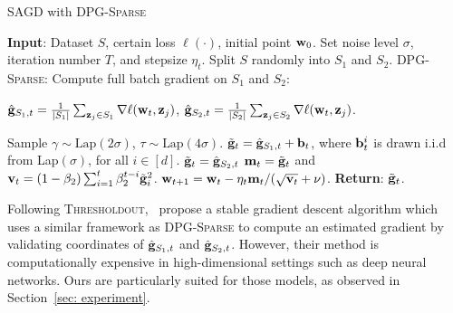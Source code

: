 \documentclass[11pt]{article}
\begin{document}
\begin{algorithm}[H]
\caption{\textsc{SAGD} with \textsc{DPG-Sparse}}
\begin{algorithmic}[1]
\label{algo: sparse}
\STATE \textbf{Input}: Dataset $S$,  certain loss $\ell(\cdot)$, initial point $\mathbf{w}_0$.
\STATE Set  noise level $\sigma$, iteration number $T$,  and stepsize $\eta_t$.
\STATE Split $S$ randomly into $S_1$ and $S_2$. 
\STATE   \textsc{DPG-Sparse:} Compute full batch gradient on $S_1$ and $S_2$:\\
\centerline{$\hat {\mathbf{g}}_{S_1,t} = \frac{1}{|S_1|} \sum_{\mathbf{z}_j \in S_1}\nabla \ell(\mathbf{w}_t, \mathbf{z}_j)$,%
\hspace{0.2in}
$\hat {\mathbf{g}}_{S_2,t} = \frac{1}{|S_2|} \sum_{\mathbf{z}_j \in S_2}\nabla \ell(\mathbf{w}_t, \mathbf{z}_j)$.}
\STATE Sample $\gamma \sim \text{Lap}(2\sigma)$, $\tau \sim \text{Lap}(4\sigma)$.
\STATE  $\tilde {\mathbf{g}}_t = \hat {\mathbf{g}}_{S_1,t} + \mathbf{b}_t$, where $\mathbf{b}_t^i$ is drawn i.i.d from Lap$(\sigma)$, for all $ i \in [d]$.
\ELSE \STATE $\tilde {\mathbf{g}}_t = \hat {\mathbf{g}}_{S_2,t}$
\ENDIF
\STATE 
$\mathbf{m}_t = \tilde {\mathbf{g}}_t$ and $\mathbf{v}_t = \left(1-\beta_{2}\right) \sum_{i=1}^{t} \beta_{2}^{t-i} \tilde {\mathbf{g}}_{i}^{2}$.
\STATE $\mathbf{w}_{t+1}=\mathbf{w}_{t}-\eta_t \mathbf{m}_t /(\sqrt{\mathbf{v}_t}+\nu)$.
\ENDFOR 
\STATE \textbf{Return}: $\tilde {\mathbf{g}}_t$.
\end{algorithmic}
\end{algorithm}\vspace{-0.1in}

Following \textsc{Thresholdout},~\citet{zhch2018} propose a stable gradient descent algorithm which uses a similar framework as \textsc{DPG-Sparse} to compute an estimated gradient by validating coordinates of $\hat {\mathbf{g}}_{S_1,t}$ and $\hat {\mathbf{g}}_{S_2,t}$. 
However, their method is computationally expensive in high-dimensional settings such as deep neural networks. Ours are particularly suited for those models, as observed in Section~\ref{sec: experiment}.
\end{document}
